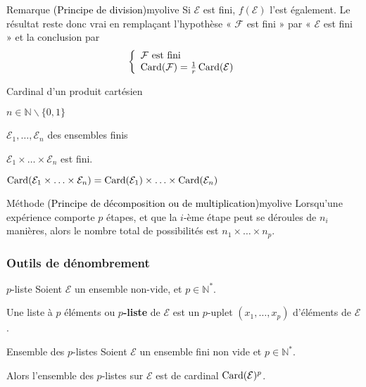     \begin{omed}{Remarque \textcolor{black}{(Principe de division)}}{myolive}
        Si $\mathcal{E}$ est fini, $f(\mathcal{E})$ l’est également. Le résultat reste donc vrai en remplaçant l’hypothèse « $\mathcal{F}$ est fini » par « $\mathcal{E}$ est fini » et la conclusion par \[ \et{\mathcal{F} \text{ est fini}}{\card(\mathcal{F}) =  \frac{1}{r} \card(\mathcal{E})} \]
    \end{omed}

    \begin{prop}{Cardinal d’un produit cartésien}{}
        \begin{soient}
            \item $n \in \mathbb{N} \backslash \{ 0,1 \}$
            \item $\mathcal{E}_1,\ldots,\mathcal{E}_n$ des ensembles finis
        \end{soient}
        \begin{alors}
            \item $\mathcal{E}_1 \times \ldots \times \mathcal{E}_n$ est fini.
            \item $\operatorname{Card}(\mathcal{E}_1 \times \ldots \times \mathcal{E}_n) = \operatorname{Card}(\mathcal{E}_1) \times \ldots \times \operatorname{Card}(\mathcal{E}_n)$
        \end{alors}
    \end{prop}

    \begin{omed}{Méthode \textcolor{black}{(Principe de décomposition ou de multiplication)}}{myolive}
        Lorsqu’une expérience comporte $p$ étapes, et que la $i$-ème étape peut se déroules de $n_i$ manières, alors le nombre total de possibilités est $n_1 \times \ldots \times n_p$.
    \end{omed}

    \subsubsection{Outils de dénombrement}

    \begin{defi}{$p$-liste}{}
        Soient $\mathcal{E}$ un ensemble non-vide, et $p \in \mathbb{N}^*$.

        Une liste à $p$ éléments ou \textbf{$p$-liste} de $\mathcal{E}$ est un $p$-uplet $(x_1,\ldots,x_p)$ d’éléments de $\mathcal{E}$.
    \end{defi}

    \begin{theo}{Ensemble des $p$-listes}{}
        Soient $\mathcal{E}$ un ensemble fini non vide et $p \in \mathbb{N}^*$.
    
        Alors l’ensemble des $p$-listes sur $\mathcal{E}$ est de cardinal $\operatorname{Card}(\mathcal{E})^p$.
    \end{theo}

